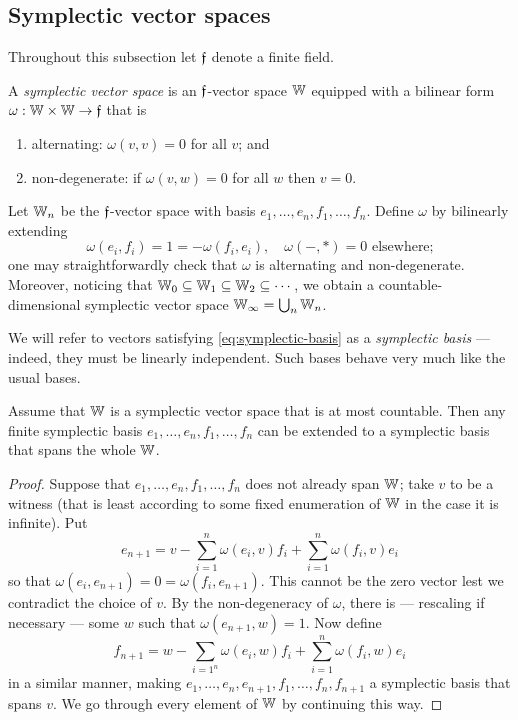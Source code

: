 \subsection{Symplectic vector spaces}
Throughout this subsection let $\mathfrak{f}$ denote a finite field.
\begin{definition}
    A \emph{symplectic vector space} is an $\mathfrak{f}$-vector space $\mathbb{W}$ 
    equipped with a bilinear form $\omega: \mathbb{W} \times \mathbb{W} \to \mathfrak{f}$ that is
    \begin{enumerate}
        \item alternating: $\omega(v, v) = 0$ for all $v$; and
        \item non-degenerate: if $\omega(v, w) = 0$ for all $w$ then $v = 0$.
    \end{enumerate}
\end{definition}

\begin{example}
    Let $\mathbb{W}_n$ be the $\mathfrak{f}$-vector space with basis $e_1  , \ldots, e_n, f_1, \ldots, f_n$.
    Define $\omega$ by bilinearly extending
    \begin{equation}\label{eq:symplectic-basis}
        \omega(e_i, f_i) = 1 = -\omega(f_i, e_i),\quad
        \omega(-, *) = 0 \text{ elsewhere;}
        \tag{\S}
    \end{equation}
    one may straightforwardly check that $\omega$ is alternating and non-degenerate.
    Moreover, noticing that $\mathbb{W}_0 \subseteq \mathbb{W}_1 \subseteq \mathbb{W}_2 \subseteq \cdots$,
    we obtain a countable-dimensional symplectic vector space $\mathbb{W}_\infty = \bigcup_n \mathbb{W}_n$.
\end{example}

We will refer to vectors satisfying \eqref{eq:symplectic-basis} as a \emph{symplectic basis} 
--- indeed, they must be linearly independent.
Such bases behave very much like the usual bases.

\begin{proposition}\label{prop:symplectic-basis}
    Assume that $\mathbb{W}$ is a symplectic vector space that is at most countable.
    Then any finite symplectic basis $e_1, \ldots, e_n, f_1, \ldots, f_n$ 
    can be extended to a symplectic basis that spans the whole $\mathbb{W}$.
\end{proposition}
\begin{proof}
    Suppose that $e_1, \ldots, e_n, f_1, \ldots, f_n$ does not already span $\mathbb{W}$;
    take $v$ to be a witness (that is least according to some fixed enumeration of $\mathbb{W}$ 
    in the case it is infinite).
    Put
    \[
        e_{n+1} = v - \sum_{i=1}^n \omega(e_i, v) f_i + \sum_{i=1}^n \omega(f_i, v) e_i
    \]
    so that $\omega(e_i, e_{n+1}) = 0 = \omega(f_i, e_{n+1})$.
    This cannot be the zero vector lest we contradict the choice of $v$.
    By the non-degeneracy of $\omega$, there is --- rescaling if necessary 
    --- some $w$ such that $\omega(e_{n+1}, w) = 1$. 
    Now define
    \[
        f_{n+1} = w - \sum_{i=1^n} \omega(e_i, w) f_i + \sum_{i=1}^n \omega(f_i, w) e_i
    \]
    in a similar manner, 
    making $e_1, \ldots, e_n, e_{n+1}, f_1, \ldots, f_n, f_{n+1}$ a symplectic basis that spans $v$.
    We go through every element of $\mathbb{W}$ by continuing this way.
\end{proof}

